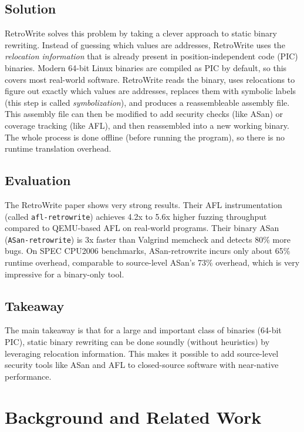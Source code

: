 \documentclass[10pt,a4paper]{article}
\begin{document}
\subsection{Solution}
RetroWrite \cite{retrowrite} solves this problem by taking a clever approach to static binary rewriting. Instead of guessing which values are addresses, RetroWrite uses the \textit{relocation information} that is already present in position-independent code (PIC) binaries. Modern 64-bit Linux binaries are compiled as PIC by default, so this covers most real-world software. RetroWrite reads the binary, uses relocations to figure out exactly which values are addresses, replaces them with symbolic labels (this step is called \textit{symbolization}), and produces a reassembleable assembly file. This assembly file can then be modified to add security checks (like ASan) or coverage tracking (like AFL), and then reassembled into a new working binary. The whole process is done offline (before running the program), so there is no runtime translation overhead.

\subsection{Evaluation}
The RetroWrite paper shows very strong results. Their AFL instrumentation (called \texttt{afl-retrowrite}) achieves 4.2x to 5.6x higher fuzzing throughput compared to QEMU-based AFL on real-world programs. Their binary ASan (\texttt{ASan-retrowrite}) is 3x faster than Valgrind memcheck and detects 80\% more bugs. On SPEC CPU2006 benchmarks, ASan-retrowrite incurs only about 65\% runtime overhead, comparable to source-level ASan's 73\% overhead, which is very impressive for a binary-only tool.

\subsection{Takeaway}
The main takeaway is that for a large and important class of binaries (64-bit PIC), static binary rewriting can be done soundly (without heuristics) by leveraging relocation information. This makes it possible to add source-level security tools like ASan and AFL to closed-source software with near-native performance.

\section{Background and Related Work}
\end{document}
